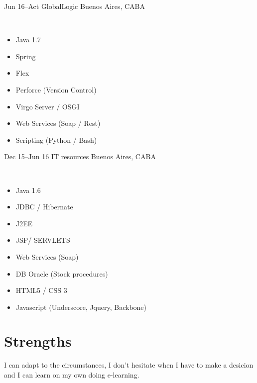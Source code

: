 \documentclass[]{cv-style}
\begin{document}
\begin{entrylist}
\entry
  {Jun 16--Act} 
  { GlobalLogic}
  {Buenos Aires, CABA}
  {\\ 
  \begin{itemize}
    \item Java 1.7
    \item Spring
    \item Flex
    \item Perforce (Version Control)
    \item Virgo Server / OSGI
    \item Web Services (Soap / Rest)
    \item Scripting (Python / Bash)
  \end{itemize}}
  
{\vspace{-0.3cm}}
\end{entrylist}


\begin{entrylist}
\entry
  {Dec 15--Jun 16}
  { IT resources}
  {Buenos Aires, CABA}
  {\\ 
  \begin{itemize}
    \item Java 1.6
    \item JDBC / Hibernate
    \item J2EE
    \item JSP/ SERVLETS
    \item Web Services (Soap)
    \item DB Oracle (Stock procedures)
    \item HTML5 / CSS 3
    \item Javascript (Underscore, Jquery, Backbone)
    
  \end{itemize}}
  
{\vspace{-0.3cm}}
\end{entrylist}


\section{Strengths}
  \vspace{-0.2cm}

I can adapt to the circumstances, I don't hesitate when I have to make a desicion and I can learn on my own doing e-learning.
\end{document}
